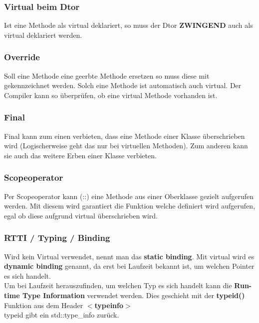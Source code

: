 \subsubsection{Virtual beim Dtor}

Ist eine Methode als virtual deklariert, so muss der Dtor \textbf{ZWINGEND} auch als virtual deklariert werden.

\subsubsection{Override}

Soll eine Methode eine geerbte Methode ersetzen so muss diese mit  gekennzeichnet werden. 
Solch eine Methode ist automatisch auch virtual.
Der Compiler kann so überprüfen, ob eine virtual Methode vorhanden ist.

\subsubsection{Final}

Final kann zum einen verbieten, dass eine Methode einer Klasse überschrieben wird
(Logischerweise geht das nur bei virtuellen Methoden). 
Zum anderen kann sie auch das weitere Erben einer Klasse verbieten. 

\subsubsection{Scopeoperator}

Per Scopeoperator kann (::) eine Methode aus einer Oberklasse gezielt aufgerufen werden. 
Mit diesem wird garantiert die Funktion welche definiert wird aufgerufen, egal ob diese aufgrund virtual überschrieben wird. 



\subsubsection{RTTI / Typing / Binding}

Wird kein Virtual verwendet, nennt man das \textbf{static binding}. 
Mit virtual wird es \textbf{dynamic binding} genannt, da erst bei Laufzeit bekannt ist, um welchen Pointer es sich handelt.\\
Um bei Laufzeit herauszufinden, um welchen Typ es sich handelt kann die \textbf{Run-time Type Information} verwendet werden. 
Dies geschieht mit der \textbf{typeid()} Funktion aus dem Header \textbf{$<$typeinfo$>$}\\
typeid gibt ein std::type\_info zurück. 

